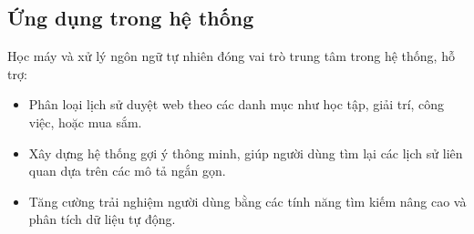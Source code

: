 \subsection{Ứng dụng trong hệ thống}

Học máy và xử lý ngôn ngữ tự nhiên đóng vai trò trung tâm trong hệ thống, hỗ trợ:
\begin{itemize}
    \item Phân loại lịch sử duyệt web theo các danh mục như học tập, giải trí, công việc, hoặc mua sắm.
    \item Xây dựng hệ thống gợi ý thông minh, giúp người dùng tìm lại các lịch sử liên quan dựa trên các mô tả ngắn gọn.
    \item Tăng cường trải nghiệm người dùng bằng các tính năng tìm kiếm nâng cao và phân tích dữ liệu tự động.
\end{itemize}
